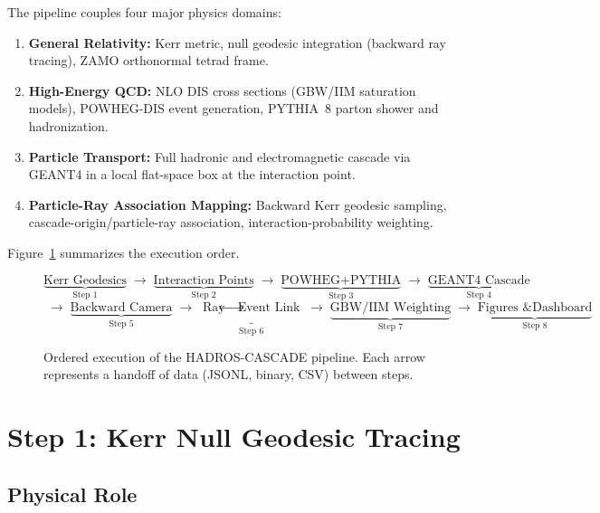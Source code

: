 \documentclass[11pt,a4paper]{article}
\begin{document}
The pipeline couples four major physics domains:
\begin{enumerate}[leftmargin=2cm]
  \item \textbf{General Relativity:} Kerr metric, null geodesic integration (backward ray tracing), ZAMO orthonormal tetrad frame.
  \item \textbf{High-Energy QCD:} NLO DIS cross sections (GBW/IIM saturation models), POWHEG-DIS event generation, PYTHIA~8 parton shower and hadronization.
  \item \textbf{Particle Transport:} Full hadronic and electromagnetic cascade via GEANT4 in a local flat-space box at the interaction point.
  \item \textbf{Particle-Ray Association Mapping:} Backward Kerr geodesic sampling, cascade-origin/particle-ray association, interaction-probability weighting.
\end{enumerate}

Figure~\ref{fig:pipeline_overview} summarizes the execution order.

\begin{figure}[h!]
\centering
\begin{mdframed}[backgroundcolor=lightbg, linecolor=boxborder]
\small\centering
\[
\underbrace{\text{Kerr Geodesics}}_{\text{Step 1}}
\;\longrightarrow\;
\underbrace{\text{Interaction Points}}_{\text{Step 2}}
\;\longrightarrow\;
\underbrace{\text{POWHEG+PYTHIA}}_{\text{Step 3}}
\;\longrightarrow\;
\underbrace{\text{GEANT4 Cascade}}_{\text{Step 4}}
\]
\[
\;\longrightarrow\;
\underbrace{\text{Backward Camera}}_{\text{Step 5}}
\;\longrightarrow\;
\underbrace{\text{Ray$\leftrightarrow$Event Link}}_{\text{Step 6}}
\;\longrightarrow\;
\underbrace{\text{GBW/IIM Weighting}}_{\text{Step 7}}
\;\longrightarrow\;
\underbrace{\text{Figures \& Dashboard}}_{\text{Step 8}}
\]
\end{mdframed}
\caption{Ordered execution of the HADROS-CASCADE pipeline. Each arrow represents a handoff of data (JSONL, binary, CSV) between steps.}
\label{fig:pipeline_overview}
\end{figure}

\section{Step 1: Kerr Null Geodesic Tracing}
\label{sec:geodesics}

\subsection{Physical Role}
\end{document}
